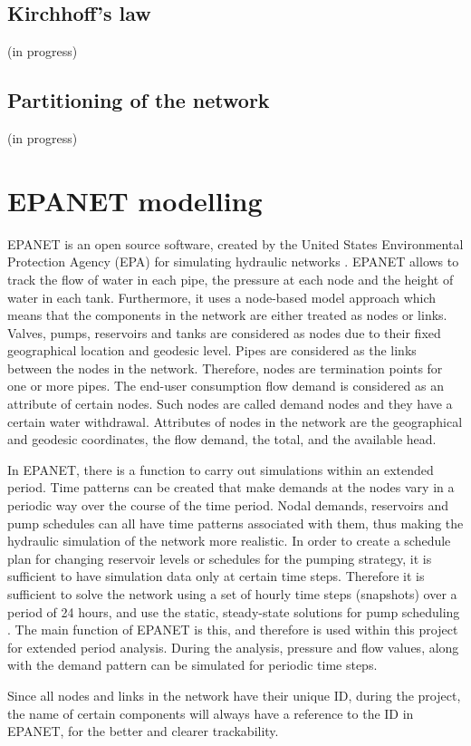 \subsection{Kirchhoff's law}
\label{kirchhoffs_law}

(in progress)

\subsection{Partitioning of the network}
\label{partitioning_of_the_network}

(in progress)

\section{EPANET modelling}
\label{EPANET_modelling}

EPANET is an open source software, created by the United States Environmental Protection Agency (EPA) for simulating hydraulic networks \cite{agency2016epanet}. EPANET allows to track the flow of water in each pipe, the pressure at each node and the height of water in each tank. Furthermore, it uses a node-based model approach which means that the components in the network are either treated as nodes or links. Valves, pumps, reservoirs and tanks are considered as nodes due to their fixed geographical location and geodesic level. Pipes are considered as the links between the nodes in the network. Therefore, nodes are termination points for one or more pipes. The end-user consumption flow demand is considered as an attribute of certain nodes. Such nodes are called demand nodes and they have a certain water withdrawal. Attributes of nodes in the network are the geographical and geodesic coordinates, the flow demand, the total, and the available head. \cite{agency2016epanet}  

In EPANET, there is a function to carry out simulations within an extended period. Time patterns can be created that make demands at the nodes vary in a periodic way over the course of the time period. Nodal demands, reservoirs and pump schedules can all have time patterns associated with them, thus making the hydraulic simulation of the network more realistic. In order to create a schedule plan for changing reservoir levels or schedules for the pumping strategy, it is sufficient to have simulation data only at certain time steps. Therefore it is sufficient to solve the network using a set of hourly time steps (snapshots) over a period of 24 hours, and use the static, steady-state solutions for pump scheduling \cite{agency2016epanet}. The main function of EPANET is this, and therefore is used within this project for extended period analysis. During the analysis, pressure and flow values, along with the demand pattern can be simulated for periodic time steps. 

Since all nodes and links in the network have their unique ID, during the project, the name of certain components will always have a reference to the ID in EPANET, for the better and clearer trackability. 









